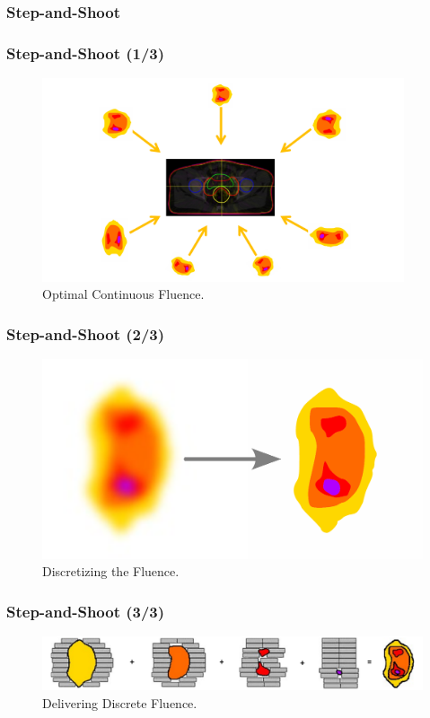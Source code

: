 \documentclass{beamer}
\begin{document}
	\subsubsection{Step-and-Shoot}
	\begin{frame}
		\frametitle{Step-and-Shoot (1/3)}
		\begin{figure}
			\includegraphics[height=6cm]{vector_images/optimal_fluences.pdf}
			\caption{Optimal Continuous Fluence.}
		\end{figure}
	\end{frame}
	\begin{frame}
	\frametitle{Step-and-Shoot (2/3)}
	\begin{figure}
		\includegraphics[width=\linewidth]{vector_images/fluence_discretization.pdf}
		\caption{Discretizing the Fluence.}
	\end{figure}
	\end{frame}
	\begin{frame}
		\frametitle{Step-and-Shoot (3/3)}
		\begin{figure}
			\includegraphics[width=\linewidth]{vector_images/step_and_shoot.pdf}
			\caption{Delivering Discrete Fluence.}
		\end{figure}
	\end{frame}
	
\end{document}
